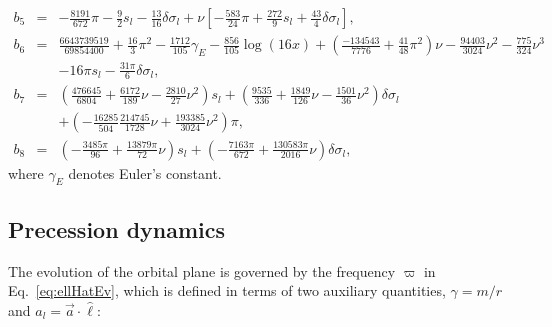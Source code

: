 \documentclass[aps,prd,amsmath,floatfix,twocolumn,superscriptaddress,nofootinbib,showpacs]{revtex4-1}
\newcommand{\ellHat}{\ensuremath{\hat{\ell}}}
\begin{document}
\begin{widetext}
\begin{eqnarray}
b_{5} &=& -\frac{8191}{672}\pi - \frac{9}{2}s_{l} - \frac{13}{16}\delta\sigma_{l} + \nu\left[-\frac{583}{24}\pi + \frac{272}{9}s_{l} + \frac{43}{4}\delta\sigma_{l}\right],\\
b_{6} &=& \frac{6643739519}{69854400} + \frac{16}{3}\pi^{2} - \frac{1712}{105}\gamma_{E} - \frac{856}{105}\log(16x)+
 \left(\frac{-134543}{7776}+\frac{41}{48}\pi^{2}\right)\nu -
 \frac{94403}{3024}\nu^{2}-\frac{775}{324}\nu^{3} \nonumber\\
 && - 16\pi s_{l} - \frac{31\pi}{6}\delta\sigma_{l},\\
 b_{7}&=& \left(\frac{476645}{6804} + \frac{6172}{189}\nu -
   \frac{2810}{27}\nu^{2}\right)s_{l} +
 \left(\frac{9535}{336}+\frac{1849}{126}\nu -
   \frac{1501}{36}\nu^{2}\right)\delta\sigma_{l} \nonumber\\
&&+  \left(-\frac{16285}{504} \frac{214745}{1728}\nu +\frac{193385}{3024}\nu^{2}\right)\pi,\\
 b_{8} &=& \left(-\frac{3485\pi}{96} + \frac{13879\pi}{72}\nu\right)s_{l} + \left(-\frac{7163\pi}{672} + \frac{130583\pi}{2016}\nu\right)\delta\sigma_l,
\end{eqnarray}
where $\gamma_E$ denotes Euler's constant.

\subsection{Precession dynamics}
\label{ap:orbitalEvolution}
The evolution of the orbital plane is governed by the frequency
$\varpi$ in Eq.~\eqref{eq:ellHatEv}, which is defined in terms of two
auxiliary quantities, $\gamma=m/r$ and
$a_l=\vec{a}\cdot{\ellHat}$:


\end{widetext}
\end{document}
